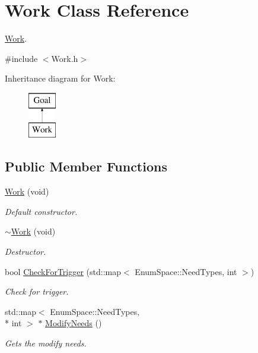 \hypertarget{class_work}{\section{Work Class Reference}
\label{class_work}
}


\hyperlink{class_work}{Work}.  




{\ttfamily \#include $<$Work.\-h$>$}

Inheritance diagram for Work\-:\begin{figure}[H]
\begin{center}
\leavevmode
\includegraphics[height=2.000000cm]{class_work}
\end{center}
\end{figure}
\subsection*{Public Member Functions}
\begin{DoxyCompactItemize}
\item 
\hyperlink{class_work_a509eb5062adfa7a18d5afbda644a9f01}{Work} (void)
\begin{DoxyCompactList}\small\item\em Default constructor. \end{DoxyCompactList}\item 
\hyperlink{class_work_a78f0a891f2ae21fb43bc6bbea6c98d64}{$\sim$\-Work} (void)
\begin{DoxyCompactList}\small\item\em Destructor. \end{DoxyCompactList}\item 
bool \hyperlink{class_work_a40c1c9341d1168f04eb4007bb65782aa}{Check\-For\-Trigger} (std\-::map$<$ Enum\-Space\-::\-Need\-Types, int $>$)
\begin{DoxyCompactList}\small\item\em Check for trigger. \end{DoxyCompactList}\item 
std\-::map$<$ Enum\-Space\-::\-Need\-Types, \\*
int $>$ $\ast$ \hyperlink{class_work_a0216999798080e27c939fb9048e4696c}{Modify\-Needs} ()
\begin{DoxyCompactList}\small\item\em Gets the modify needs. \end{DoxyCompactList}\end{DoxyCompactItemize}


